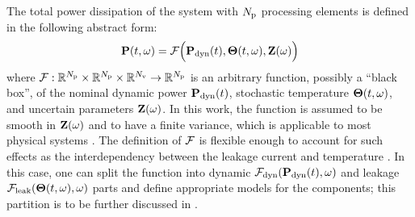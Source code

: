 The total power dissipation of the system with ${N_\text{p}}$ processing elements is defined in the following abstract form:
\begin{equation} \elabel{power-model}
  \vP(\t, \o) = \f\Big(\vP_\dyn(\t), \vTO(\t, \o), \vZ(\o)\Big)
\end{equation}
where $\mathcal{F}: \mathbb{R}^{N_\text{p}} \times \mathbb{R}^{N_\text{p}} \times \mathbb{R}^{N_\text{v}} \to \mathbb{R}^{N_\text{p}}$ is an arbitrary function, possibly a ``black box'', of the nominal dynamic power $\mathbf{P}_{\text{dyn}}(t)$, stochastic temperature ${\boldsymbol\Theta}(t, \omega)$, and uncertain parameters $\mathbf{Z}(\omega)$. In this work, the function is assumed to be smooth in $\mathbf{Z}(\omega)$ and to have a finite variance, which is applicable to most physical systems \cite{xiu2002}. The definition of $\mathcal{F}$ is flexible enough to account for such effects as the interdependency between the leakage current and temperature \cite{srivastava2010, liu2007}. In this case, one can split the function into dynamic $\mathcal{F}_{\text{dyn}}(\mathbf{P}_{\text{dyn}}(t), \omega)$ and leakage $\mathcal{F}_{\text{leak}}({\boldsymbol\Theta}(t, \omega), \omega)$ parts and define appropriate models for the components; this partition is to be further discussed in .
